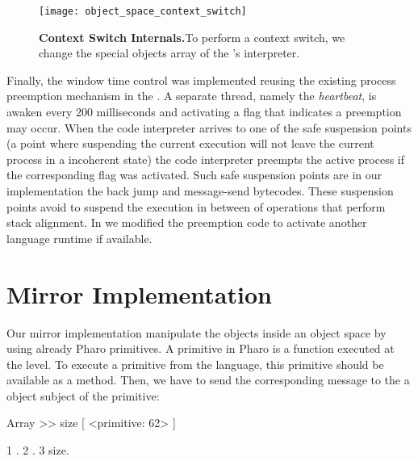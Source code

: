 \begin{figure*}[htb]
\begin{center}
\texttt{[image: object\_space\_context\_switch]}
\caption{\textbf{Context Switch Internals.}To perform a context switch, we change the special objects array of the \VM's interpreter.\label{fig:context_switch}}
\end{center}
\end{figure*}

Finally, the window time control was implemented reusing the existing process preemption mechanism in the \VM. A separate thread, namely the \emph{heartbeat}, is awaken every 200 milliseconds and activating a flag that indicates a preemption may occur. When the \VM code interpreter arrives to one of the safe suspension points (\ie a point where suspending the current execution will not leave the current process in a incoherent state) the code interpreter preempts the active process if the corresponding flag was activated. Such safe suspension points are in our implementation the back jump and message-send bytecodes. These suspension points avoid to suspend the execution in between of \eg operations that perform stack alignment. In \Vtt we modified the preemption code to activate another language runtime if available.

\section{Mirror Implementation}\label{sec:implementation_mirrors}

Our mirror implementation manipulate the objects inside an object space by using already Pharo \VM primitives. A primitive in Pharo is a function executed at the \VM level. To execute a primitive from the language, this primitive should be available as a method. Then, we have to send the corresponding message to the a object subject of the primitive:

\begin{code}
Array >> size [
    <primitive: 62>
]

{1 . 2 . 3} size.
\end{code}

